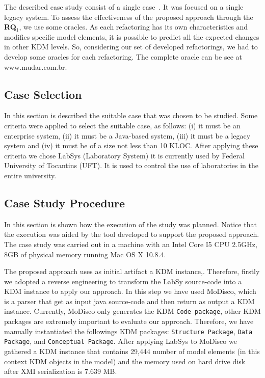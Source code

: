The described case study consist of a single case~\cite{Brereton:2008}. It was focused on a single legacy system. To assess the effectiveness of the proposed approach through the \textbf{RQ$_1$}, we use some oracles. As each refactoring has its own characteristics and modifies specific model elements, it is possible to predict all the expected changes in other KDM levels. So, considering our set of developed refactorings, we had to develop some oracles for each refactoring. The complete oracle can be see at www.mudar.com.br.

\subsection{Case Selection}

In this section is described the suitable case that was chosen to be studied. Some criteria were applied to select the suitable case, as follows: (i) it must be an enterprise system, (ii) it must be a Java-based system, (iii) it must be a legacy system and (iv) it must be of a size not less than 10 KLOC. After applying these criteria we chose LabSys (Laboratory System) it is currently used by Federal University of Tocantins (UFT). It is used to control the use of laboratories in the entire university. 

\subsection{Case Study Procedure}\label{sec:caseStudyProcedure}

In this section is shown how the execution of the study was planned. Notice that the execution was aided by the tool developed to support the proposed approach. The case study was carried out in a machine with an Intel Core I5 CPU 2.5GHz, 8GB of physical memory running Mac OS X 10.8.4.

The proposed approach uses as initial artifact a KDM instance,. Therefore, firstly we adopted a reverse engineering to  transform the LabSy source-code into a KDM instance to apply our approach. In this step we have used MoDisco\cite{Brunele20141012}, which is a parser that get as input java source-code and then return as output a KDM instance. Currently, MoDisco only generates the KDM \texttt{Code package}, other KDM packages are extremely important to evaluate our approach. Therefore, we have manually instantiated the followings KDM packages: \texttt{Structure Package}, \texttt{Data Package}, and \texttt{Conceptual Package}. After applying LabSys to MoDisco we gathered a KDM instance that contains 29,444 number of model elements (in this context KDM objects in the model) and the memory used on hard drive disk after XMI serialization is 7.639 MB. 


